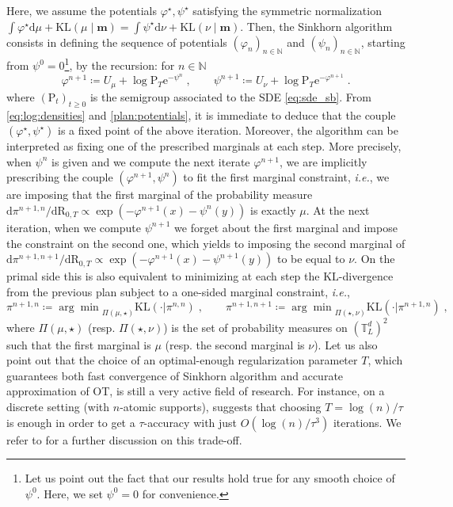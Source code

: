 \documentclass[final,12pt]{colt2023} %
\def\ie{\textit{i.e.}}
\newcommand{\De}{\mathrm{d}}
\newcommand{\rmP}{\mathrm{P}}
\newcommand{\rmR}{\mathrm{R}}
\newcommand{\rme}{\mathrm{e}}
\newcommand{\mm}{\mathbf{m}}
\def\torus{\tset}
\def\torusL{\torus_L}
\def\tset{\mathbb{T}}
\def\ie{\textit{i.e.}}
\def\eqsp{\;}
\def\varphistar{\varphi^\star}
\def\psistar{\psi^{\star}}
\begin{document}
  Here, we assume the potentials $\varphistar,\psistar$ satisfying the symmetric normalization $
\int\varphistar\De\mu+\mathrm{KL}(\mu\mid\mm)=\int\psistar\De\nu+\mathrm{KL}(\nu \mid\mm)$.
  Then, the  Sinkhorn algorithm \citep{Sinkhorn64,marinogerolin2020} consists in defining  the sequence of potentials $(\varphi_n)_{n \in \mathbb{N}}$ and $(\psi_n)_{n \in \mathbb{N}}$, starting from $\psi^0=0$\footnote{Let us point out the fact that our results hold true for any smooth choice of $\psi^0$. Here, we set $\psi^0=0$ for convenience.}, by the recursion: for $n\in \mathbb{N}$
  \begin{equation}
    \label{eq:sinkhorn_iterate}
\varphi^{n+1}\coloneqq U_{\mu}+ \log \rmP_T \rme^{-\psi^n}
 \eqsp, \qquad \psi^{n+1} \coloneqq U_{\nu}+\log \rmP_T \rme^{-\varphi^{n+1}} \eqsp.
\end{equation}
where $(\rmP_t)_{t\geq 0}$ is the semigroup associated to the SDE \eqref{eq:sde_sb}. From \eqref{eq:log:densities} and \eqref{plan:potentials}, it is immediate to deduce that the couple $(\varphistar, \psistar)$ is a fixed point of the above iteration. Moreover, the algorithm can be interpreted as fixing one of the prescribed marginals at each step. More precisely, when $\psi^n$ is given and we compute the next iterate $\varphi^{n+1}$, we are implicitly prescribing the couple $(\varphi^{n+1},\psi^n)$ to fit the first marginal constraint, \ie, we are imposing that the first marginal of the probability measure $\De \pi^{n+1,n}/\De \rmR_{0,T}\propto\exp(-\varphi^{n+1}(x)-\psi^n(y))$ is exactly $\mu$. At the next iteration, when we compute $\psi^{n+1}$ we forget about the first marginal and impose the constraint on the second one, which yields to imposing the second marginal of $\De \pi^{n+1,n+1}/\De \rmR_{0,T}\propto\exp(-\varphi^{n+1}(x)-\psi^{n+1}(y))$ to be equal to $\nu$. On the primal side this is also equivalent to minimizing at each step the $\mathrm{KL}$-divergence from the previous plan subject to a one-sided marginal constraint, \ie,
\begin{equation}
\label{eq:primal_pb}
\pi^{n+1,n}\coloneqq{\arg\min}_{\Pi(\mu,\star)} \mathrm{KL}(\cdot|\pi^{n,n})\eqsp, \qquad\pi^{n+1,n+1}\coloneqq {\arg\min}_{\Pi(\star,\nu)} \mathrm{KL}(\cdot|\pi^{n+1,n})\eqsp,
\end{equation}
where $\Pi(\mu,\star)$ (resp. $\Pi(\star,\nu)$) is the set of probability measures on $(\torusL^d)^2$ such that the first marginal is $\mu$ (resp. the second marginal is $\nu$). Let us also point out that the choice of an optimal-enough regularization parameter $T$, which guarantees both fast convergence of Sinkhorn algorithm and accurate approximation of OT, is still a very active field of research. For instance, on a discrete setting (with $n$-atomic supports), \cite{altschuler2017} suggests that choosing $T=\log(n)/\tau$ is enough in order to get a $\tau$-accuracy with just $O(\log(n)/\tau^3)$ iterations. We refer to \cite{peyre2019computational} for a further discussion on this trade-off.
\end{document}
